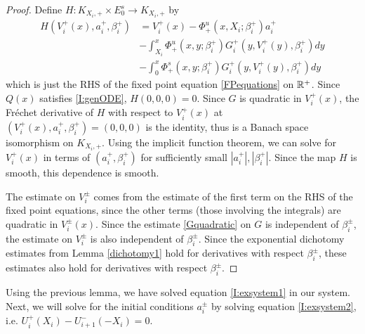 \documentclass[thesis.tex]{subfiles}
\begin{document}
\begin{lemma}
\begin{proof}
Define $H: K_{X_i, +} \times E_0^s \rightarrow K_{X_i, +}$ by
\begin{align*}
H(V_i^+(x), a_i^+, \beta_i^+) &= V_i^+(x) - \Phi^u_+(x, X_i; \beta_i^+) a_i^+  \\
&- \int_{X_i}^x \Phi_+^u(x, y; \beta_i^+) G_i^+(y, V_i^+(y),\beta_i^+)dy \\
&- \int_0^x \Phi_+^s(x, y; \beta_i^+) G_i^+(y, V_i^+(y),\beta_i^+)dy 
\end{align*}
which is just the RHS of the fixed point equation \eqref{FPequations} on ${\mathbb R}^+$. Since $Q(x)$ satisfies \eqref{I:genODE}, $H(0, 0, 0) = 0$. Since $G$ is quadratic in $V_i^+(x)$, the Fr\'echet derivative of $H$ with respect to $V_i^+(x)$ at $(V_i^+(x), a_i^+, \beta_i^+) = (0, 0, 0)$ is the identity, thus is a Banach space isomorphism on $K_{X_i, +}$. Using the implicit function theorem, we can solve for $V_i^+(x)$ in terms of $(a_i^+, \beta_i^+)$ for sufficiently small $|a_i^+|, |\beta_i^+|$. Since the map $H$ is smooth, this dependence is smooth.

The estimate on $V_i^\pm$ comes from the estimate of the first term on the RHS of the fixed point equations, since the other terms (those involving the integrals) are quadratic in $V_i^\pm(x)$. Since the estimate \eqref{Gquadratic} on $G$ is independent of $\beta_i^\pm$, the estimate on $V_i^\pm$ is also independent of $\beta_i^\pm$. Since the exponential dichotomy estimates from Lemma \ref{dichotomy1} hold for derivatives with respect $\beta_i^\pm$, these estimates also hold for derivatives with respect $\beta_i^\pm$.
\end{proof}
\end{lemma}

Using the previous lemma, we have solved equation \eqref{I:exsystem1} in our system. Next, we will solve for the initial conditions $a_i^\pm$ by solving equation \eqref{I:exsystem2}, i.e. $U_i^+(X_i) - U_{i+1}^-(-X_i) = 0$.

\end{document}
